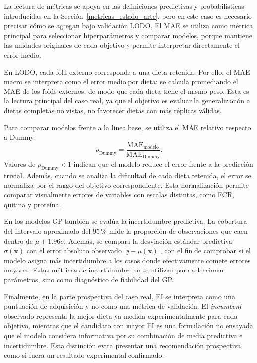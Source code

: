 La lectura de métricas se apoya en las definiciones predictivas y probabilísticas introducidas en la Sección~\ref{metricas_estado_arte}, pero en este caso es necesario precisar cómo se agregan bajo validación LODO. El MAE se utiliza como métrica principal para seleccionar hiperparámetros y comparar modelos, porque mantiene las unidades originales de cada objetivo y permite interpretar directamente el error medio.

En LODO, cada fold externo corresponde a una dieta retenida. Por ello, el MAE macro se interpreta como el error medio por dieta: se calcula promediando el MAE de los folds externos, de modo que cada dieta tiene el mismo peso. Esta es la lectura principal del caso real, ya que el objetivo es evaluar la generalización a dietas completas no vistas, no favorecer dietas con más réplicas válidas.

Para comparar modelos frente a la línea base, se utiliza el MAE relativo respecto a Dummy: \[\rho_{\mathrm{Dummy}} = \frac{\mathrm{MAE}_{\mathrm{modelo}}}{\mathrm{MAE}_{\mathrm{Dummy}}}.\] Valores de \(\rho_{\mathrm{Dummy}}<1\) indican que el modelo reduce el error frente a la predicción trivial. Además, cuando se analiza la dificultad de cada dieta retenida, el error se normaliza por el rango del objetivo correspondiente. Esta normalización permite comparar visualmente errores de variables con escalas distintas, como FCR, quitina y proteína.

En los modelos GP también se evalúa la incertidumbre predictiva. La cobertura del intervalo aproximado del 95 \% mide la proporción de observaciones que caen dentro de \(\mu \pm 1.96\sigma\). Además, se compara la desviación estándar predictiva \(\sigma(\bm{x})\) con el error absoluto observado \(|y-\mu(\bm{x})|\), con el fin de comprobar si el modelo asigna más incertidumbre a los casos donde efectivamente comete errores mayores. Estas métricas de incertidumbre no se utilizan para seleccionar parámetros, sino como diagnóstico de fiabilidad del GP.

Finalmente, en la parte prospectiva del caso real, EI se interpreta como una puntuación de adquisición y no como una métrica de validación. El \emph{incumbent} observado representa la mejor dieta ya medida experimentalmente para cada objetivo, mientras que el candidato con mayor EI es una formulación no ensayada que el modelo considera informativa por su combinación de media predictiva e incertidumbre. Esta distinción evita presentar una recomendación prospectiva como si fuera un resultado experimental confirmado.


